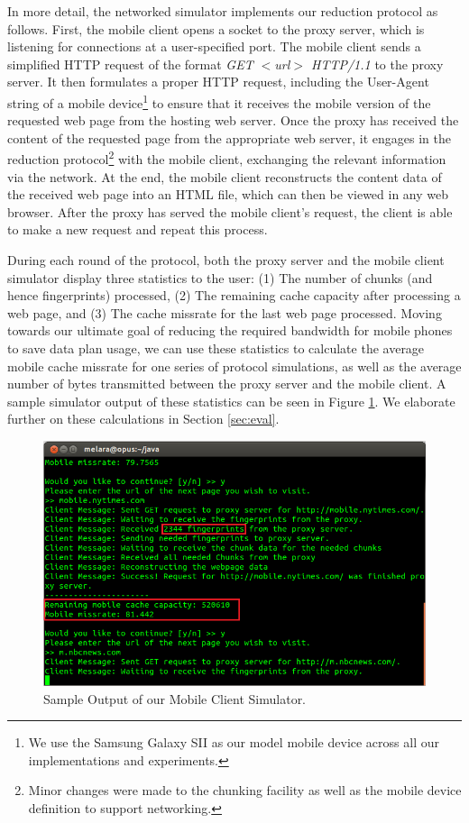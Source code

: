 In more detail, the networked simulator implements our reduction protocol as follows. First, the mobile client opens a socket to the proxy server, which is listening for connections at a user-specified port. The mobile client sends a simplified HTTP request of the format \emph{GET $<$url$>$ HTTP/1.1} to the proxy server. It then formulates a proper HTTP request, including the User-Agent string of a mobile device\footnote{We use the Samsung Galaxy SII as our model mobile device across all our implementations and experiments.} to ensure that it receives the mobile version of the requested web page from the hosting web server. Once the proxy has received the content of the requested page from the appropriate web server, it engages in the reduction protocol\footnote{Minor changes were made to the chunking facility as well as the mobile device definition to support networking.} with the mobile client, exchanging the relevant information via the network. At the end, the mobile client reconstructs the content data of the received web page into an HTML file, which can then be viewed in any web browser. After the proxy has served the mobile client's request, the client is able to make a new request and repeat this process.

During each round of the protocol, both the proxy server and the mobile client simulator display three statistics to the user: (1) The number of chunks (and hence fingerprints) processed, (2) The remaining cache capacity after processing a web page, and (3) The cache missrate for the last web page processed. Moving towards our ultimate goal of reducing the required bandwidth for mobile phones to save data plan usage, we can use these statistics to calculate the average mobile cache missrate for one series of protocol simulations, as well as the average number of bytes transmitted between the proxy server and the mobile client. A sample simulator output of these statistics can be seen in Figure \ref{fig:mobsim_output}. We elaborate further on these calculations in Section \ref{sec:eval}.

\begin{figure}[h] 
\centering \includegraphics[scale=0.40]{images/mobilesim_output.png}
\caption{Sample Output of our Mobile Client Simulator.}
\label{fig:mobsim_output}
\end{figure}

